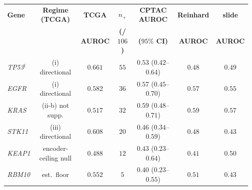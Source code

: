 \footnotesize
\setlength{\tabcolsep}{4pt}
\renewcommand{\arraystretch}{1.2}
\begin{tabular}{l c c c c c c}
\toprule
\textbf{Gene} & \textbf{Regime (TCGA)} & \textbf{TCGA} & \textbf{$n_+$} &
  \textbf{CPTAC AUROC} & \textbf{Reinhard} & \textbf{slide} \\
              &                        & \textbf{AUROC} & \textbf{(/$106$)} &
  \textbf{($95\%$ CI)} & \textbf{AUROC} & \textbf{AUROC} \\
\midrule
\textit{TP53}$^\dagger$  & (i) directional  & $0.661$ & $55$ & $0.53$ ($0.42$--$0.64$) & $0.48$ & $0.49$ \\
\textit{EGFR}            & (i) directional  & $0.582$ & $36$ & $0.57$ ($0.45$--$0.70$) & $0.57$ & $0.55$ \\
\textit{KRAS}            & (ii-b) not supp. & $0.517$ & $32$ & $0.59$ ($0.48$--$0.71$) & $0.59$ & $0.57$ \\
\textit{STK11}           & (iii) directional& $0.608$ & $20$ & $0.46$ ($0.34$--$0.59$) & $0.48$ & $0.43$ \\
\textit{KEAP1}           & encoder-ceiling null & $0.488$ & $12$ & $0.43$ ($0.23$--$0.64$) & $0.41$ & $0.50$ \\
\textit{RBM10}           & est.\ floor      & $0.552$ & $5$  & $0.40$ ($0.23$--$0.55$) & $0.51$ & $0.43$ \\
\bottomrule
\end{tabular}
